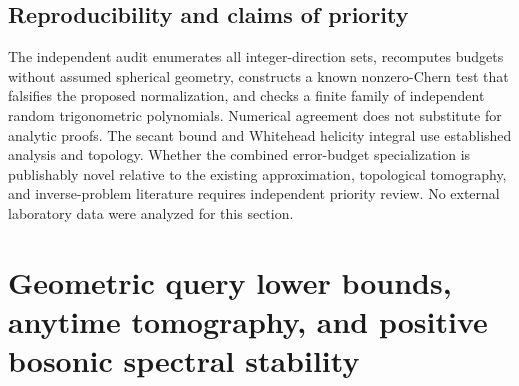 \documentclass[aps,prd,onecolumn,notitlepage,11pt,superscriptaddress,longbibliography]{revtex4-2}
\begin{document}
\subsection{Reproducibility and claims of priority}
The independent audit enumerates all integer-direction sets, recomputes budgets without assumed spherical geometry, constructs a known nonzero-Chern test that falsifies the proposed normalization, and checks a finite family of independent random trigonometric polynomials. Numerical agreement does not substitute for analytic proofs. The secant bound and Whitehead helicity integral use established analysis and topology. Whether the combined error-budget specialization is publishably novel relative to the existing approximation, topological tomography, and inverse-problem literature requires independent priority review. No external laboratory data were analyzed for this section.

\section{Geometric query lower bounds, anytime tomography, and positive bosonic spectral stability}\label{sec:v7}
\end{document}
